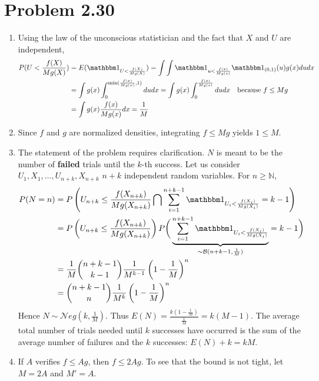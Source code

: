 \documentclass[a4paper,11pt]{article}
\begin{document}
\section*{Problem 2.30}
\begin{enumerate}[label=(\alph*)]
  \item Using the law of the unconscious statistician and the fact that $X$ and $U$ are independent, $$\begin{aligned}
    P(U<\frac{f(X)}{Mg(X)}) &= E(\mathbbm 1_{U<\frac{f(X)}{Mg(X)}}) = \int \int  \mathbbm 1_{u<\frac{f(x)}{Mg(x)}} \mathbbm 1_{(0,1)}(u) g(x) du dx \\
    &= \int g(x) \int_0^{\min(\frac{f(x)}{Mg(x)},1)}du dx = \int g(x) \int_0^{\frac{f(x)}{Mg(x)}}du dx \quad \text{because } f\leq Mg\\
    &= \int g(x)\frac{f(x)}{Mg(x)} dx = \frac 1M
  \end{aligned} $$
  \item Since $f$ and $g$ are normalized densities, integrating $f\leq M g$ yields $1\leq M$.
  \item The statement of the problem requires clarification. $N$ is meant to be the number of \textbf{failed} trials until the $k$-th success. Let us consider $U_1,X_1,\ldots, U_{n+k},X_{n+k}$ $n+k$ independent random variables. For $n\geq \mathbb N$, $$\begin{aligned}
   P(N=n) &= P\left(U_{n+k}\leq \frac{f(X_{n+k})}{Mg(X_{n+k})}\bigcap \sum_{i=1}^{n+k-1} \mathbbm 1_{U_i<\frac{f(X_i)}{Mg(X_i)}} = k-1\right) \\
   &= P\left(U_{n+k}\leq \frac{f(X_{n+k})}{Mg(X_{n+k})}\right) P\bigg(\underbrace{\sum_{i=1}^{n+k-1} \mathbbm 1_{U_i<\frac{f(X_i)}{Mg(X_i)}}}_{\sim \mathcal B(n+k-1,\frac 1M)} = k-1\bigg) \\
   &= \frac 1M \binom{n+k-1}{k-1}\frac{1}{M^{k-1}}\left(1-\frac 1M \right)^n\\
   &= \binom{n+k-1}{n} \frac{1}{M^{k}}\left(1-\frac 1M \right)^n
  \end{aligned}$$
  Hence $N\sim \mathcal{N}eg(k,\frac 1M)$. Thus $\displaystyle E(N) = \frac{k (1-\frac 1M)}{\frac 1M} = k(M-1)$. The average total number of trials needed until $k$ successes have occurred is the sum of the average number of failures and the $k$ successes: $E(N)+k = kM$.
  \item If $A$ verifies $f\leq Ag$, then $f\leq 2Ag$. To see that the bound is not tight, let $M=2A$ and $M'=A$.


\end{enumerate}
\end{document}
